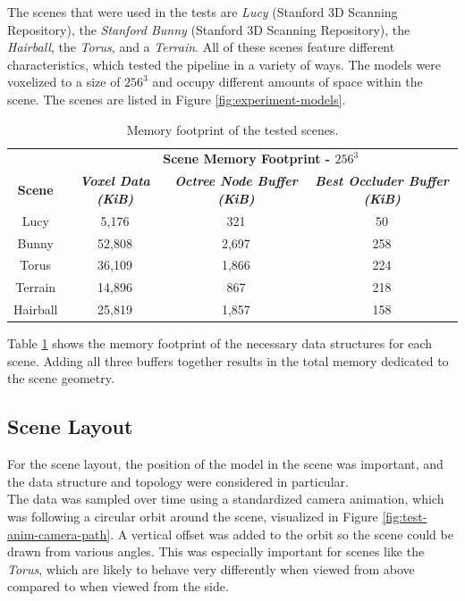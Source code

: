 \noindent
The scenes that were used in the tests are \emph{Lucy} (Stanford 3D Scanning Repository), the 
\emph{Stanford Bunny} (Stanford 3D Scanning Repository), the \emph{Hairball}, the \emph{Torus}, 
and a \emph{Terrain}. All of these scenes feature different characteristics, which tested 
the pipeline in a variety of ways. The models were voxelized to a size of $256^3$ and occupy 
different amounts of space within the scene. The scenes are listed in Figure 
\ref{fig:experiment-models}. \\

\begin{table}[htbp]
  \begin{center}
    \begin{tabular}{|c|c|c|c|}
      \hline
      \textbf{}&\multicolumn{3}{|c|}{\textbf{Scene Memory Footprint - $256^3$}} \\
      \cline{2-4} 
      \textbf{Scene} & \textbf{\textit{Voxel Data (KiB)}}& \textbf{\textit{Octree Node Buffer (KiB)}} & \textbf{\textit{Best Occluder Buffer (KiB)}} \\
      \hline
      Lucy        & 5,176   & 321   & 50  \\
      Bunny       & 52,808  & 2,697 & 258 \\
      Torus       & 36,109  & 1,866 & 224 \\
      Terrain     & 14,896  & 867   & 218 \\
      Hairball    & 25,819  & 1,857 & 158 \\
      \hline
    \end{tabular}
  \end{center}
  \caption{Memory footprint of the tested scenes.}
  \label{tbl:scene-data-size}
\end{table}

\noindent
Table \ref{tbl:scene-data-size} shows the memory footprint of the necessary data structures for 
each scene. Adding all three buffers together results in the total memory dedicated to the scene 
geometry.


\subsection*{Scene Layout} \label{subsec-scene-layout}

For the scene layout, the position of the model in the scene was important, and the data structure and 
topology were considered in particular. \\

\noindent
The data was sampled over time using a standardized camera animation, which was following a circular orbit 
around the scene, visualized in Figure \ref{fig:test-anim-camera-path}. A vertical offset was added to the orbit 
so the scene could be drawn from various angles. This was especially important for scenes like the \emph{Torus}, 
which are likely to behave very differently when viewed from above compared to when viewed from the side. \\

